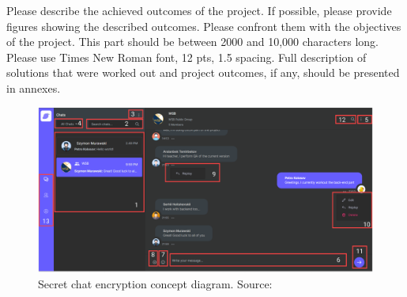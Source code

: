 Please describe the achieved outcomes of the project.
If possible, please provide figures showing the described outcomes.
Please confront them with the objectives of the project.
This part should be between 2000 and 10,000 characters long.
Please use Times New Roman font, 12 pts, 1.5 spacing.
Full description of solutions that were worked out and project outcomes, if any, should be presented in annexes.
\begin{figure}[H]
    \centering
    \includegraphics[width=1\textwidth]{Pictures/Messenger-1}
    \caption{Secret chat encryption concept diagram. Source: }\label{fig:figure5}
\end{figure}

